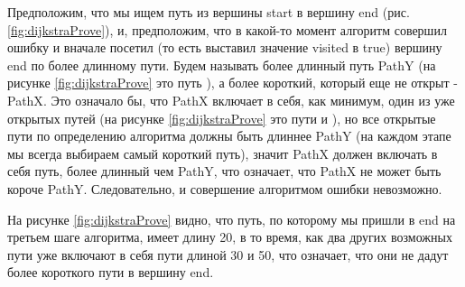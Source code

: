 \documentclass[../../article.tex]{subfiles}
\begin{document}
Предположим, что мы ищем путь из вершины {\firacodebold start} в вершину {\firacodebold end} (рис. \ref{fig:dijkstraProve}), и, предположим, что в какой-то момент алгоритм совершил ошибку и вначале посетил (то есть выставил значение {\firacodebold visited} в {\firacodebold true}) вершину {\firacodebold end} по более длинному пути. Будем называть более длинный путь {\firacodebold PathY} (на рисунке \ref{fig:dijkstraProve} это путь {}), а более короткий, который еще не открыт - {\firacodebold PathX}. Это означало бы, что {\firacodebold PathX} включает в себя, как минимум, один из уже открытых путей (на рисунке \ref{fig:dijkstraProve} это пути {\firacodebold [start, b]} и {\firacodebold [start, c, a]}), но все открытые пути по определению алгоритма должны быть длиннее {\firacodebold PathY} (на каждом этапе мы всегда выбираем самый короткий путь), значит {\firacodebold PathX} должен включать в себя путь, более длинный чем {\firacodebold PathY}, что означает, что {\firacodebold PathX} не может быть короче {\firacodebold PathY}. Следовательно, и совершение алгоритмом ошибки невозможно.

На рисунке \ref{fig:dijkstraProve} видно, что путь, по которому мы пришли в {\firacodebold end} на третьем шаге алгоритма, имеет длину 20, в то время, как два других возможных пути уже включают в себя пути длиной 30 и 50, что означает, что они не дадут более короткого пути в вершину {\firacodebold end}.
\end{document}
